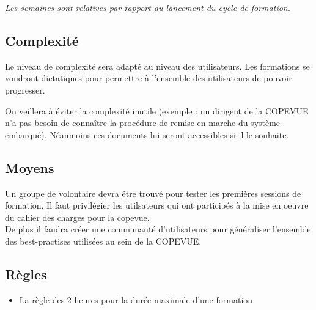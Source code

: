\textit{Les semaines sont relatives par rapport au lancement du cycle de formation.}


\subsection{Complexité}

Le niveau de complexité sera adapté au niveau des utilisateurs. Les formations
se voudront dictatiques pour permettre à l'ensemble des utilisateurs de pouvoir
progresser.

On veillera à éviter la complexité inutile (exemple : un dirigent de la COPEVUE
n'a pas besoin de connaître la procédure de remise en marche du système embarqué). 
Néanmoins ces documents lui seront accessibles si il le souhaite.

\subsection{Moyens}

Un groupe de volontaire devra être trouvé pour tester les premières sessions de
formation. Il faut privilégier les utilsateurs qui ont participés à la mise en
oeuvre du cahier des charges pour la copevue. \\

De plus il faudra créer une communauté d'utilisateurs pour généraliser l'ensemble
des best-practises utilisées au sein de la COPEVUE.


\subsection{Règles}

\begin{itemize}
	\item La règle des 2 heures pour la durée maximale d'une formation
\end{itemize}

